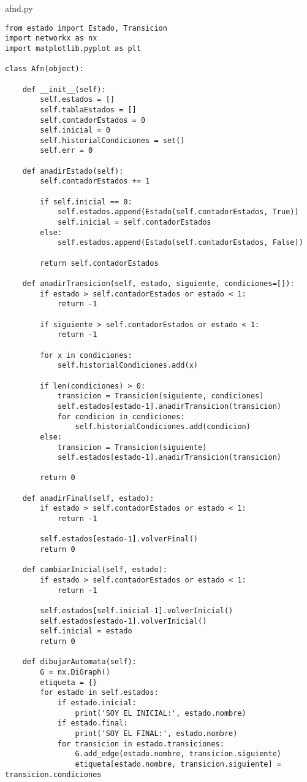 afnd.py
\lstset{language=Python, breaklines=true, basicstyle=\footnotesize}
\begin{lstlisting}[frame=single]
from estado import Estado, Transicion
import networkx as nx
import matplotlib.pyplot as plt

class Afn(object):

    def __init__(self):
        self.estados = []
        self.tablaEstados = []
        self.contadorEstados = 0
        self.inicial = 0
        self.historialCondiciones = set()
        self.err = 0

    def anadirEstado(self):
        self.contadorEstados += 1

        if self.inicial == 0:
            self.estados.append(Estado(self.contadorEstados, True))
            self.inicial = self.contadorEstados
        else:
            self.estados.append(Estado(self.contadorEstados, False))

        return self.contadorEstados

    def anadirTransicion(self, estado, siguiente, condiciones=[]):
        if estado > self.contadorEstados or estado < 1:
            return -1

        if siguiente > self.contadorEstados or estado < 1:
            return -1

        for x in condiciones:
            self.historialCondiciones.add(x)

        if len(condiciones) > 0:
            transicion = Transicion(siguiente, condiciones)
            self.estados[estado-1].anadirTransicion(transicion)
            for condicion in condiciones:
                self.historialCondiciones.add(condicion)
        else:
            transicion = Transicion(siguiente)
            self.estados[estado-1].anadirTransicion(transicion)

        return 0

    def anadirFinal(self, estado):
        if estado > self.contadorEstados or estado < 1:
            return -1

        self.estados[estado-1].volverFinal()
        return 0

    def cambiarInicial(self, estado):
        if estado > self.contadorEstados or estado < 1:
            return -1

        self.estados[self.inicial-1].volverInicial()
        self.estados[estado-1].volverInicial()
        self.inicial = estado
        return 0

    def dibujarAutomata(self):
        G = nx.DiGraph()
        etiqueta = {}
        for estado in self.estados:
            if estado.inicial:
                print('SOY EL INICIAL:', estado.nombre)
            if estado.final:
                print('SOY EL FINAL:', estado.nombre)
            for transicion in estado.transiciones:
                G.add_edge(estado.nombre, transicion.siguiente)
                etiqueta[estado.nombre, transicion.siguiente] = transicion.condiciones


\end{lstlisting}
